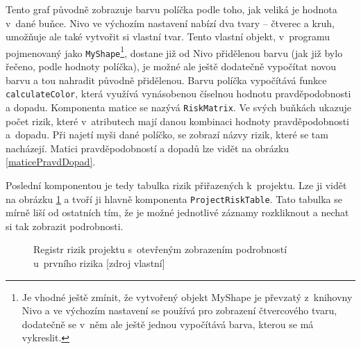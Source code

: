 Tento graf původně zobrazuje barvu políčka podle toho, jak veliká je hodnota v~dané buňce. Nivo ve výchozím nastavení nabízí dva tvary – čtverec a kruh, umožňuje ale také vytvořit si vlastní tvar. Tento vlastní objekt, v~programu pojmenovaný jako \texttt{MyShape}\footnote{Je vhodné ještě zmínit, že vytvořený objekt MyShape je převzatý z~knihovny Nivo a ve výchozím nastavení se používá pro zobrazení čtvercového tvaru, dodatečně se v~něm ale ještě jednou vypočítává barva, kterou se má vykreslit.}, dostane již od Nivo přidělenou barvu (jak již bylo řečeno, podle hodnoty políčka), je možné ale ještě dodatečně vypočítat novou barvu a tou nahradit původně přidělenou. Barvu políčka vypočítává funkce \texttt{calculateColor}, která využívá vynásobenou číselnou hodnotu pravděpodobnosti a dopadu. Komponenta matice se nazývá \texttt{RiskMatrix}. Ve svých buňkách ukazuje počet rizik, které v~atributech mají danou kombinaci hodnoty pravděpodobnosti a~dopadu. Při najetí myši dané políčko, se zobrazí názvy rizik, které se tam nacházejí. Matici pravděpodobností a dopadů lze vidět na obrázku \ref{maticePravdDopad}.

    
Poslední komponentou je tedy tabulka rizik přiřazených k~projektu. Lze ji vidět na obrázku \ref{registrRizikTable} a tvoří ji hlavně komponenta \texttt{ProjectRiskTable}. Tato tabulka se mírně liší od ostatních tím, že je možné jednotlivé záznamy rozkliknout a nechat si tak zobrazit podrobnosti.

    \begin{figure}[!h]
    \begin{center}
    \caption{Registr rizik projektu s~otevřeným zobrazením podrobností u~prvního rizika [zdroj vlastní]}
    \label{registrRizikTable}
    \end{center}
    \end{figure}

